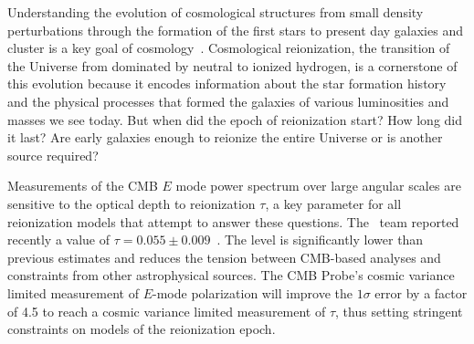 \vspace{-0.05in}

Understanding the evolution of cosmological structures from small density perturbations through the formation of the
first stars to present day galaxies and cluster is a key goal of cosmology~\cite{dunlop2011}. 
Cosmological reionization, the transition of the Universe from dominated by neutral to ionized 
hydrogen, is a cornerstone of this evolution because it encodes information 
about the star formation history and the physical processes that formed the galaxies of various luminosities and masses we see today. 
But when did the epoch of reionization start?  How long did it last? Are early galaxies enough to reionize the entire Universe
or is another source required?
 
Measurements of the \ac{CMB} $E$ mode power spectrum over large angular scales are sensitive to the optical depth 
to reionization $\tau$, a key parameter for all reionization models that attempt to answer these questions. 
The \planck\ team  reported recently a value of $\tau=0.055 \pm 0.009$~\cite{planck2015-XLVI,planck2015-XXXI}.
The level is significantly lower than previous estimates and reduces the tension between CMB-based analyses and constraints from 
other astrophysical sources.  
The CMB Probe's cosmic variance limited measurement of $E$-mode polarization will 
improve the $1\sigma$ error by a factor of 4.5 to reach a cosmic 
variance limited measurement of $\tau$, thus setting 
stringent constraints on models of the reionization epoch. 


